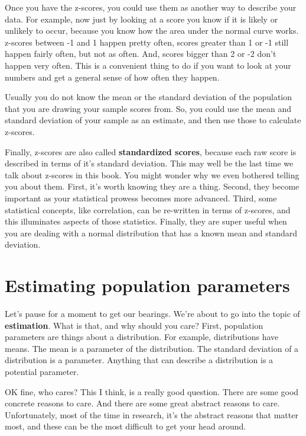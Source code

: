 \documentclass[
]{book}
\begin{document}
Once you have the z-scores, you could use them as another way to describe your data. For example, now just by looking at a score you know if it is likely or unlikely to occur, because you know how the area under the normal curve works. z-scores between -1 and 1 happen pretty often, scores greater than 1 or -1 still happen fairly often, but not as often. And, scores bigger than 2 or -2 don't happen very often. This is a convenient thing to do if you want to look at your numbers and get a general sense of how often they happen.

Usually you do not know the mean or the standard deviation of the population that you are drawing your sample scores from. So, you could use the mean and standard deviation of your sample as an estimate, and then use those to calculate z-scores.

Finally, z-scores are also called \textbf{standardized scores}, because each raw score is described in terms of it's standard deviation. This may well be the last time we talk about z-scores in this book. You might wonder why we even bothered telling you about them. First, it's worth knowing they are a thing. Second, they become important as your statistical prowess becomes more advanced. Third, some statistical concepts, like correlation, can be re-written in terms of z-scores, and this illuminates aspects of those statistics. Finally, they are super useful when you are dealing with a normal distribution that has a known mean and standard deviation.

\section{Estimating population parameters}\label{estimating-population-parameters}

Let's pause for a moment to get our bearings. We're about to go into the topic of \textbf{estimation}. What is that, and why should you care? First, population parameters are things about a distribution. For example, distributions have means. The mean is a parameter of the distribution. The standard deviation of a distribution is a parameter. Anything that can describe a distribution is a potential parameter.

OK fine, who cares? This I think, is a really good question. There are some good concrete reasons to care. And there are some great abstract reasons to care. Unfortunately, most of the time in research, it's the abstract reasons that matter most, and these can be the most difficult to get your head around.
\end{document}
